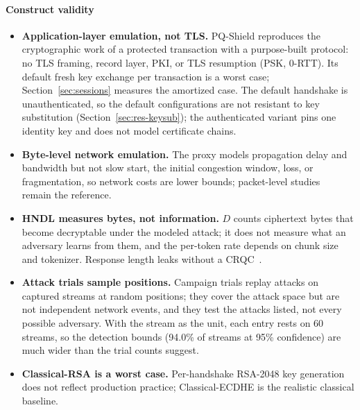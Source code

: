 \documentclass[conference]{IEEEtran}
\begin{document}
\paragraph*{Construct validity}
\begin{itemize}
  \item \textbf{Application-layer emulation, not TLS.} PQ-Shield reproduces the cryptographic work of a
  protected transaction with a purpose-built protocol: no TLS framing, record layer, PKI, or TLS
  resumption (PSK, 0-RTT). Its default fresh key exchange per transaction is a worst case;
  Section~\ref{sec:sessions} measures the amortized case. The default handshake is unauthenticated, so
  the default configurations are not resistant to key substitution
  (Section~\ref{sec:res-keysub}); the authenticated variant pins one identity key and does not model
  certificate chains.
  \item \textbf{Byte-level network emulation.} The proxy models propagation delay and bandwidth but not
  slow start, the initial congestion window, loss, or fragmentation, so network costs are lower bounds;
  packet-level studies~\cite{paquin2020benchmarking,sikeridis2020authentication} remain the reference.
  \item \textbf{HNDL measures bytes, not information.} $D$ counts ciphertext bytes that become decryptable
  under the modeled attack; it does not measure what an adversary learns from them, and the per-token rate
  depends on chunk size and tokenizer. Response length leaks without a CRQC~\cite{weiss2024keylogging}.
  \item \textbf{Attack trials sample positions.} Campaign trials replay attacks on captured streams at
  random positions; they cover the attack space but are not independent network events, and they test the
  attacks listed, not every possible adversary. With the stream as the unit, each entry rests on 60
  streams, so the detection bounds (94.0\% of streams at 95\% confidence) are much wider than the trial
  counts suggest.
  \item \textbf{Classical-RSA is a worst case.} Per-handshake RSA-2048 key generation does not reflect
  production practice; Classical-ECDHE is the realistic classical baseline.
\end{itemize}
\end{document}

